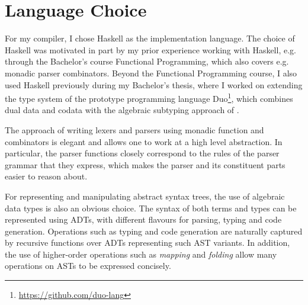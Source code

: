 \section{Language Choice}

For my compiler, I chose Haskell as the implementation language. The choice
of Haskell was motivated in part by my prior experience working with Haskell,
e.g. through the Bachelor's course Functional Programming, which also covers e.g.
monadic parser combinators.
Beyond the Functional Programming course, I also used Haskell previously during
my Bachelor's thesis, where I worked on extending the type system of the prototype
programming language Duo\footnote{\url{https://github.com/duo-lang}}, which
combines dual data and codata with the algebraic subtyping approach of
\citet{Dolan2017}.

The approach of writing lexers and parsers using monadic function and
combinators is elegant and allows one to work at a high level abstraction.
In particular, the parser functions closely correspond to the rules of the
parser grammar that they express, which makes the parser and its constituent
parts easier to reason about.

For representing and manipulating abstract syntax trees, the use of algebraic
data types is also an obvious choice. The syntax of both terms and types can be
represented using ADTs, with different flavours for parsing, typing and code
generation. Operations such as typing and code generation are naturally captured
by recursive functions over ADTs representing such AST variants.
In addition, the use of higher-order operations such as \emph{mapping} and
\emph{folding} allow many operations on ASTs to be expressed concisely.
